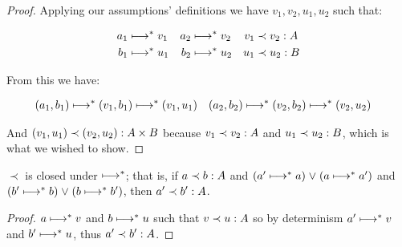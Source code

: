 \begin{proof}
  Applying our assumptions' definitions we have $v_1,v_2,u_1,u_2$ such that:

  \begin{align*}
    a_1 &\evalsto v_1
    &
    a_2 &\evalsto v_2
    &
    v_1 &\prec v_2 : A
    \\
    b_1 &\evalsto u_1
    &
    b_2 &\evalsto u_2
    &
    u_1 &\prec u_2 : B
  \end{align*}

  \noindent
  From this we have:

  \begin{align*}
    \etuple{a_1, b_1} \evalsto \etuple{v_1, b_1} &\evalsto \etuple{v_1, u_1}
    &
    \etuple{a_2, b_2} \evalsto \etuple{v_2, b_2} &\evalsto \etuple{v_2, u_2}
  \end{align*}

  \noindent
  And $\oplrvalue{A \times B}{\etuple{v_1, u_1}}{\etuple{v_2, u_2}}$ because $\oplrvalue A {v_1} {v_2}$ and $\oplrvalue B {u_1} {u_2}$, which is what we wished to show.
\end{proof}

\begin{lemma}
  $\prec$ is closed under $\evalsto$; that is, if $\oplrclosed A a b$ and $(a' \evalsto a) \vee (a \evalsto a')$ and $(b' \evalsto b) \vee (b \evalsto b')$, then $\oplrclosed A {a'} {b'}$.
\end{lemma}

\begin{proof}
  $a \evalsto v$ and $b \evalsto u$ such that $\oplrvalue A v u$ so by determinism $a' \evalsto v$ and $b' \evalsto u$, thus $\oplrclosed A {a'}{b'}$.
\end{proof}




